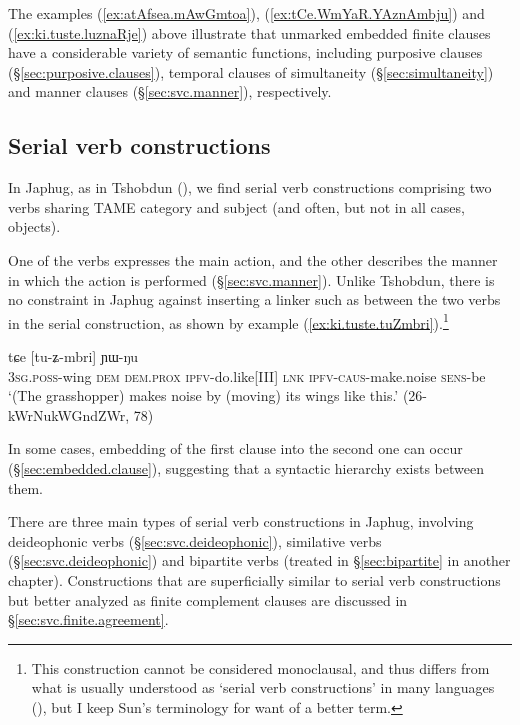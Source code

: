 The examples (\ref{ex:atAfsea.mAwGmtoa}), (\ref{ex:tCe.WmYaR.YAznAmbju}) and (\ref{ex:ki.tuste.luznaRje}) above illustrate that unmarked embedded finite clauses have a considerable variety of semantic functions, including purposive clauses (§\ref{sec:purposive.clauses}), temporal clauses of simultaneity (§\ref{sec:simultaneity}) and manner clauses (§\ref{sec:svc.manner}), respectively.


\subsection{Serial verb constructions} \label{sec:svc}
In Japhug, as in Tshobdun (\citealt[490--491]{sun12complementation}), we find serial verb constructions comprising two verbs sharing TAME category and subject (and often, but not in all cases, objects). 
 
One of the verbs expresses the main action, and the other describes the manner in which the action is performed (§\ref{sec:svc.manner}). Unlike Tshobdun, there is no constraint in Japhug against inserting a linker such as  between the two verbs in the serial construction, as shown by example (\ref{ex:ki.tuste.tuZmbri}).\footnote{This construction cannot be considered monoclausal, and thus differs from what is usually understood as `serial verb constructions' in many languages (\citealt[6]{aikhenvald06svc}), but I keep Sun's terminology for want of a better term. }

\begin{exe}
\ex \label{ex:ki.tuste.tuZmbri}
 tɕe [tu-ʑ-mbri] ɲɯ-ŋu \\
\textsc{3sg}.\textsc{poss}-wing \textsc{dem} \textsc{dem}.\textsc{prox} \textsc{ipfv}-do.like[III] \textsc{lnk} \textsc{ipfv}-\textsc{caus}-make.noise \textsc{sens}-be \\
\glt `(The grasshopper) makes noise by (moving) its wings like this.' (26-kWrNukWGndZWr, 78)
\end{exe}

In some cases, embedding of the first clause into the second one can occur (§\ref{sec:embedded.clause}), suggesting that a syntactic hierarchy exists between them.

There are three main types of serial verb constructions in Japhug, involving deideophonic verbs (§\ref{sec:svc.deideophonic}), similative verbs (§\ref{sec:svc.deideophonic}) and bipartite verbs (treated in §\ref{sec:bipartite} in another chapter). Constructions that are superficially similar to serial verb constructions but better analyzed as finite complement clauses are discussed in §\ref{sec:svc.finite.agreement}.


